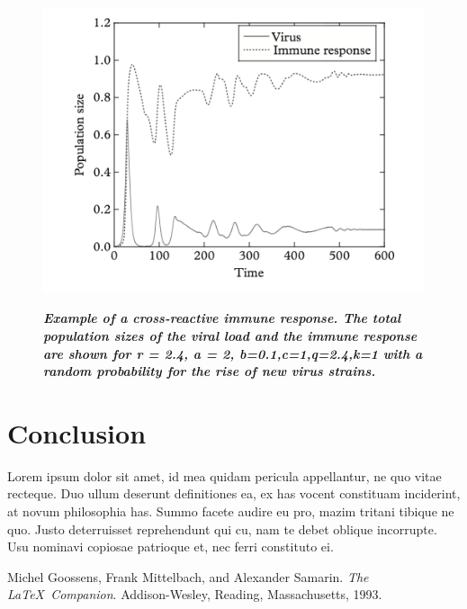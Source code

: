 \documentclass{article}
\begin{document}
\begin{figure}[h!]
    \centering
    \caption{\textbf{\textit{Example of a cross-reactive immune response. The total population sizes of the viral load and the immune response are shown for r = 2.4, a = 2, b=0.1,c=1,q=2.4,k=1 with a random probability for the rise of new virus strains.}}}
    \includegraphics[scale=.4]{imgs/hiv_graph2.png}
    \label{fig:hiv2}
\end{figure}



\section{Conclusion}
\label{sub:Conclusion}
Lorem ipsum dolor sit amet, id mea quidam pericula appellantur, ne quo vitae recteque. Duo ullum deserunt definitiones ea, ex has vocent constituam inciderint, at novum philosophia has. Summo facete audire eu pro, mazim tritani tibique ne quo. Justo deterruisset reprehendunt qui cu, nam te debet oblique incorrupte. Usu nominavi copiosae patrioque et, nec ferri constituto ei.



\begin{thebibliography}{9}
Michel Goossens, Frank Mittelbach, and Alexander Samarin. 
\textit{The \LaTeX\ Companion}. 
Addison-Wesley, Reading, Massachusetts, 1993.
\end{thebibliography}
\end{document}
